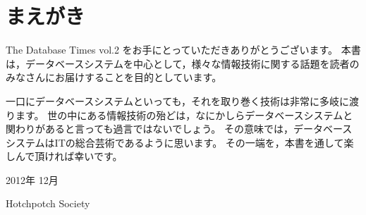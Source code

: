 
\chapter*{まえがき}
\thispagestyle{fronthead}

The Database Times vol.2 をお手にとっていただきありがとうございます。
本書は，データベースシステムを中心として，様々な情報技術に関する話題を読者のみなさんにお届けすることを目的としています。

一口にデータベースシステムといっても，それを取り巻く技術は非常に多岐に渡ります。
世の中にある情報技術の殆どは，なにかしらデータベースシステムと関わりがあると言っても過言ではないでしょう。
その意味では，データベースシステムはITの総合芸術であるように思います。
その一端を，本書を通して楽しんで頂ければ幸いです。

\begin{flushright}
 2012年 12月

Hotchpotch Society
\end{flushright}
